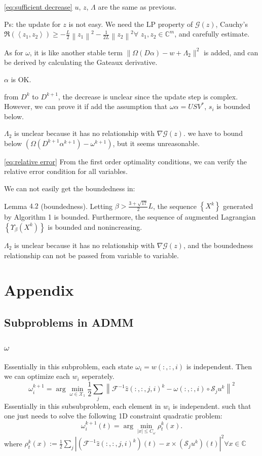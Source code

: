 \documentclass{article}
\numberwithin{equation}{section}
\begin{document}
\eqref{eq:sufficient decrease}
$u$, $z$, $\Lambda$ are the same as previous.

Ps: the update for $z$ is not easy. We need the LP property of $\mathcal{G}(z)$, Cauchy's $\Re\left(\left\langle z_{1}, z_{2}\right\rangle\right) \geq-\frac{L}{2}\left\|z_{1}\right\|^{2}-\frac{1}{2 L}\left\|z_{2}\right\|^{2} \forall$ $z_{1}, z_{2} \in \mathbb{C}^{m}$, and carefully estimate.

As for $\omega$, it is like another stable term $\| \Omega(D\alpha) - w + \Lambda_2\|^{2}$ is added, and can be derived by calculating the Gateaux derivative. 

$\alpha$ is OK.

from $D^k$ to $D^{k+1}$, the decrease is unclear since the update step is complex. However, we can prove it if add the assumption that $\omega \alpha = USV^*$, $s_i$ is bounded below.

$\Lambda_2$ is unclear because it has no relationship with $\nabla \mathcal{G}(z)$. we have to bound below $(\Omega(D^{k+1}\alpha^{k+1}) - \omega^{k+1})$, but it seems unreasonable. 

\eqref{eq:relative error}
From the first order optimality conditions, we can verify the relative error condition for all variables.

We can not easily get the boundedness in:

Lemma $4.2$ (boundedness). Letting $\beta>\frac{3+\sqrt{17}}{2} L$, the sequence $\left\{X^{k}\right\}$ generated by Algorithm 1 is bounded. Furthermore, the sequence of augmented Lagrangian $\left\{\Upsilon_{\beta}\left(X^{k}\right)\right\}$ is bounded and nonincreasing.

$\Lambda_2$ is unclear because it has no relationship with $\nabla \mathcal{G}(z)$, and the boundedness relationship can not be passed from variable to variable.

 
  \section{Appendix}
\subsection{Subproblems in ADMM}
\label{section:subproblems}
\subsubsection{$\omega$}
Essentially in this subproblem, each state $\omega_i=w(:,:,i)$ is independent. Then we can optimize each $w_i$ seperately.
 $$
 \omega_i^{k+1}=\arg \min _{\omega \in \mathcal{X}_{1}} \frac{1}{2} \sum_{j}\left\|\mathcal{F}^{-1} \hat{z}(:,:,j,i)^{k}-\omega(:,:,i) \circ \mathcal{S}_{j} u^{k}\right\|^{2}
 $$ 
 Essentially in this subsubproblem, each element in $w_i$ is independent.
 such that one just needs to solve the following 1D constraint quadratic problem:
$$
\omega_i^{k+1}(t)=\arg \min _{|x| \leq C_{\omega}} \rho_{t}^{k}(x).
$$
where
$\rho_{t}^{k}(x):=\frac{1}{2} \sum_{j}\left|\left(\mathcal{F}^{-1} \hat{z}(:,:,j,i)^{k}\right)(t)-x \times\left(\mathcal{S}_{j} u^{k}\right)(t)\right|^{2} \forall x \in \mathbb{C}$ 
\end{document}
